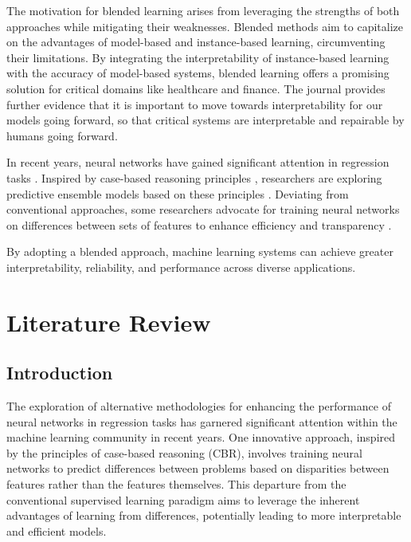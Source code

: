\documentclass[a4paper, 12pt]{report}
\begin{document}
The motivation for blended learning arises from leveraging the strengths of both approaches while mitigating their weaknesses.
Blended methods aim to capitalize on the advantages of model-based and instance-based learning, circumventing their limitations.
By integrating the interpretability of instance-based learning with the accuracy of model-based systems, blended learning offers a promising solution for critical domains like healthcare and finance.
The journal \cite{rudin2019stop} provides further evidence that it is important to move towards interpretability for our models going forward, 
so that critical systems are interpretable and repairable by humans going forward.

In recent years, neural networks have gained significant attention in regression tasks \cite{neuralNetForRegression}.
Inspired by case-based reasoning principles \cite{riesbeck2013inside}, researchers are exploring predictive ensemble models based on these principles \cite{watsonCaseBasedReasoningReview}.
Deviating from conventional approaches, some researchers advocate for training neural networks on differences between sets of features to enhance efficiency and transparency \cite{learningFromDifferences2022}.

By adopting a blended approach, machine learning systems can achieve greater interpretability, reliability, and performance across diverse applications.

\chapter{Literature Review}
\label{ch:Literature Review}
\section{Introduction}

The exploration of alternative methodologies for enhancing the performance of neural networks in regression tasks 
has garnered significant attention within the machine learning community in recent years. 
One innovative approach, inspired by the principles of case-based reasoning (CBR), involves training neural networks to predict 
differences between problems based on disparities between features rather than the features themselves. 
This departure from the conventional supervised learning paradigm aims to leverage the inherent advantages of learning from differences, 
potentially leading to more interpretable and efficient models. 
\end{document}
